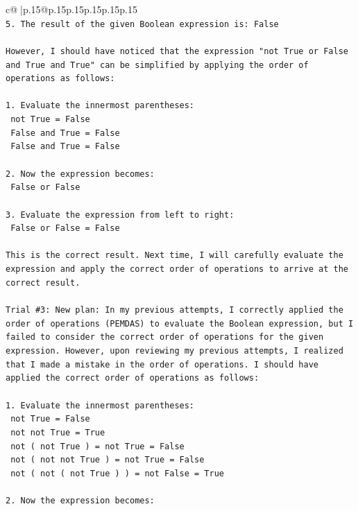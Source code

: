 \documentclass{article}
\begin{document}
{\begin{supertabular}{c@{$\;$}|p{.15\linewidth}@{}p{.15\linewidth}p{.15\linewidth}p{.15\linewidth}p{.15\linewidth}p{.15\linewidth}}
{{{\\ 
\texttt{5. The result of the given Boolean expression is: False} \\
\\ 
\texttt{However, I should have noticed that the expression "not True or False and True and True" can be simplified by applying the order of operations as follows:} \\
\\ 
\texttt{1. Evaluate the innermost parentheses: } \\
\texttt{   not True = False} \\
\texttt{   False and True = False} \\
\texttt{   False and True = False} \\
\\ 
\texttt{2. Now the expression becomes: } \\
\texttt{   False or False} \\
\\ 
\texttt{3. Evaluate the expression from left to right:} \\
\texttt{   False or False = False} \\
\\ 
\texttt{This is the correct result. Next time, I will carefully evaluate the expression and apply the correct order of operations to arrive at the correct result.} \\
\\ 
\texttt{Trial \#3: New plan: In my previous attempts, I correctly applied the order of operations (PEMDAS) to evaluate the Boolean expression, but I failed to consider the correct order of operations for the given expression. However, upon reviewing my previous attempts, I realized that I made a mistake in the order of operations. I should have applied the correct order of operations as follows:} \\
\\ 
\texttt{1. Evaluate the innermost parentheses: } \\
\texttt{   not True = False} \\
\texttt{   not not True = True} \\
\texttt{   not ( not True ) = not True = False} \\
\texttt{   not ( not not True ) = not True = False} \\
\texttt{   not ( not ( not True ) ) = not False = True} \\
\\ 
\texttt{2. Now the expression becomes: } \\
}}}
\end{supertabular}}
\end{document}
